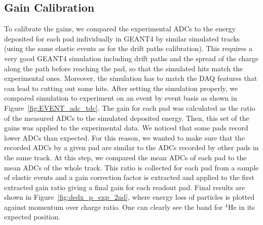 \documentclass[preprint,5p]{elsarticle}
\begin{document}
\subsection{Gain Calibration}

To calibrate the gains, we compared the experimental ADCs to the energy 
deposited for each pad individually in GEANT4 by similar simulated tracks 
(using the same elastic events as for the drift paths calibration). This 
requires a very good GEANT4 simulation including drift paths and the spread of 
the charge along the path before reaching the pad, so that the simulated hits 
match the experimental ones. Moreover, the simulation has to match the DAQ 
features that can lead to cutting out some hits. After setting the simulation 
properly, we compared simulation to experiment on an event by event basis as 
shown in Figure~\ref{fig:EVENT_adc_tdc}. The gain for each pad was calculated 
as the ratio of the measured ADCs to the simulated deposited energy. Then, this 
set of the gains was applied to the experimental data. We noticed that some 
pads record lower ADCs than expected. For this reason, we wanted to make sure 
that the recorded ADCs by a given pad are similar to the ADCs recorded by other 
pads in the same track. At this step, we compared the mean ADCs of each
pad to the mean ADCs of the whole track. This ratio is collected for each pad 
from a sample of elastic events and a gain correction factor is extracted and 
applied to the first extracted gain ratio giving a final gain for each readout 
pad. Final results are shown in Figure~\ref{fig:dedx_p_exp_2nd}, where energy 
loss of particles is plotted against momentum over charge ratio. One can 
clearly see the band for $^4$He in its expected position.
\end{document}
